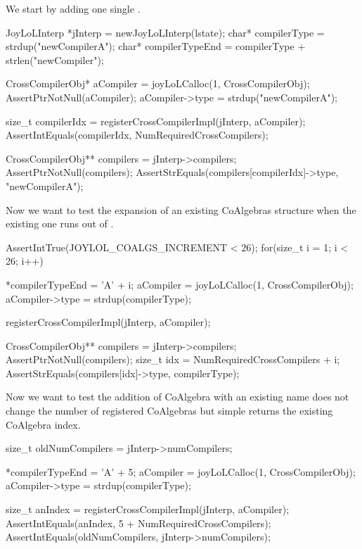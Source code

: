 
We start by adding one single . 

\startCTest
  JoyLoLInterp *jInterp = newJoyLoLInterp(lstate);
  char*             compilerType       = strdup("newCompilerA");
  char*             compilerTypeEnd    = compilerType + strlen("newCompiler");
  
  CrossCompilerObj* aCompiler = joyLoLCalloc(1, CrossCompilerObj);
  AssertPtrNotNull(aCompiler);
  aCompiler->type               = strdup("newCompilerA");

  size_t compilerIdx = registerCrossCompilerImpl(jInterp, aCompiler);
  AssertIntEquals(compilerIdx, NumRequiredCrossCompilers);

  CrossCompilerObj** compilers = jInterp->compilers;
  AssertPtrNotNull(compilers);
  AssertStrEquals(compilers[compilerIdx]->type, "newCompilerA");
\stopCTest

Now we want to test the expansion of an existing CoAlgebras structure when 
the existing one runs out of .

\startCTest
  AssertIntTrue(JOYLOL_COALGS_INCREMENT < 26);
  for(size_t i = 1; i < 26; i++) {
    *compilerTypeEnd = 'A' + i;
    aCompiler        = joyLoLCalloc(1, CrossCompilerObj);
    aCompiler->type  = strdup(compilerType);

    registerCrossCompilerImpl(jInterp, aCompiler);

    CrossCompilerObj** compilers = jInterp->compilers;
    AssertPtrNotNull(compilers);
    size_t idx = NumRequiredCrossCompilers + i;
    AssertStrEquals(compilers[idx]->type, compilerType);
  }
\stopCTest

Now we want to test the addition of CoAlgebra with an existing name does 
not change the number of registered CoAlgebras but simple returns the 
existing CoAlgebra index. 

\startCTest
  size_t oldNumCompilers = jInterp->numCompilers;

  *compilerTypeEnd       = 'A' + 5;
  aCompiler              = joyLoLCalloc(1, CrossCompilerObj);
  aCompiler->type        = strdup(compilerType);
  
  size_t anIndex = registerCrossCompilerImpl(jInterp, aCompiler);
  AssertIntEquals(anIndex, 5 + NumRequiredCrossCompilers);
  AssertIntEquals(oldNumCompilers, jInterp->numCompilers);
\stopCTest
\stopTestCase
\stopTestSuite

\startTestSuite[initializeAllLoaded]


